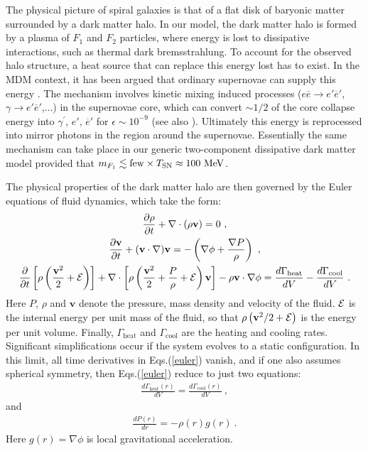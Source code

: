 \documentclass[12pt]{article}
\begin{document}
{{The physical picture of spiral galaxies is that of a flat disk of baryonic matter surrounded by a dark matter halo. In our model, the dark matter halo is formed by a plasma of $F _1$ and $F _2$ particles, where energy is lost to dissipative interactions, such as thermal dark bremsstrahlung. To account for the observed halo structure, a heat source that can replace this energy lost has to exist. In the MDM context, it has been argued that ordinary supernovae can supply this energy \cite{spheroidal,depth4,review}. The mechanism involves kinetic mixing induced processes ($e\overline{e} \rightarrow e'\overline{e}'$, $\gamma \rightarrow e'\overline{e}'$,...) in the supernovae core, which can convert $\sim 1/2$ of the core collapse energy into $\gamma ^{'}$, $e'$, $\overline{e}'$ for $\epsilon \sim 10 ^{-9}$ \cite{raf,updated} (see also \cite{silagadze}). Ultimately this energy is reprocessed into mirror photons in the region around the supernovae. Essentially the same mechanism can take place in our generic two-component dissipative dark matter model provided that $m _{F_1} \lesssim {\rm few} \times T _{\text{SN}} \approx 100 \ {\rm MeV}$.

The physical properties of the dark matter halo are then governed by the Euler equations of fluid dynamics, which take the form:
%
\begin{gather}
\frac{\partial \rho}{\partial t} + \nabla \cdot (\rho \mathbf{v}) = 0 \nonumber \ , \\
\frac{\partial \mathbf{v}}{\partial t} + (\mathbf{v} \cdot \nabla)\mathbf{v} = -\left ( \nabla \phi + \frac{\nabla P}{\rho} \right) \nonumber \ , \\
\frac{\partial}{\partial t} \left [\rho \left ( \frac{\mathbf{v}^2}{2} + {\cal E} \right ) \right ] + \nabla \cdot \left [\rho \left ( \frac{\mathbf{v}^2}{2} + \frac{P}{\rho} + {\cal E} \right ) \mathbf{v} \right ] - \rho \mathbf{v} \cdot \nabla \phi = \frac{d\Gamma _{\text{heat}}}{dV} - \frac{d\Gamma _{\text{cool}}}{dV} \ .
\label{euler}
\end{gather}
%
Here $P$, $\rho$ and $\mathbf{v}$ denote the pressure, mass density and velocity of the fluid. ${\cal E}$ is the internal energy per unit mass of the fluid, so that $\rho \left (\mathbf{v}^2/2 + {\cal E} \right )$ is the energy per unit volume. Finally, $\Gamma _{\text{heat}}$ and $\Gamma _{\text{cool}}$ are the heating and cooling rates. Significant simplifications occur if the system evolves to a static configuration. In this limit, all time derivatives in Eqs.(\ref{euler}) vanish, and if one also assumes spherical symmetry, then Eqs.(\ref{euler}) reduce to just two equations:
%
\begin{eqnarray}
\frac{d\Gamma _{\text{heat}}(r)}{dV} = \frac{d\Gamma _{\text{cool}}(r)}{dV} \ ,
\label{balance}
\end{eqnarray}
%
and
%
\begin{eqnarray}
\frac{dP(r)}{dr} = -\rho (r)g(r) \ .
\label{hydrostatic}
\end{eqnarray}
%
Here $g(r)=\nabla \phi$ is local gravitational acceleration.

}}
\end{document}
